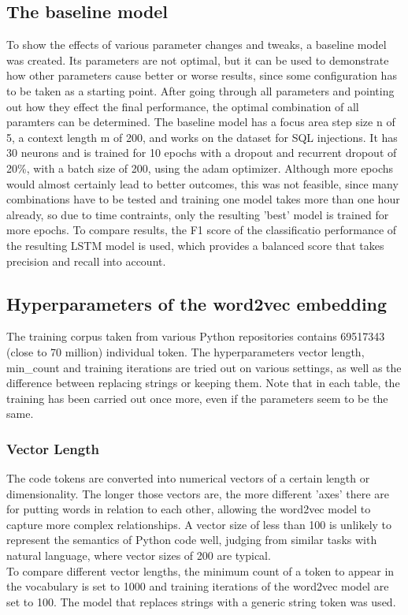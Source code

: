 \documentclass[
	a4paper,
	pagesize,
	pdftex,
	12pt,
	twoside, %
	BCOR=5mm, %
	ngerman,
	fleqn,
	final,
	]{scrartcl}
\begin{document}
\subsection{The baseline model}
To show the effects of various parameter changes and tweaks, a baseline model was created. Its parameters are not optimal, but it can be used to demonstrate how other parameters cause better or worse results, since some configuration has to be taken as a starting point. After going through all parameters and pointing out how they effect the final performance, the optimal combination of all paramters can be determined. The baseline model has a focus area step size n of 5, a context length m of 200, and works on the dataset for SQL injections. It has 30 neurons and is trained for 10 epochs with a dropout and recurrent dropout of 20\%, with a batch size of 200, using the adam optimizer. Although more epochs would almost certainly lead to better outcomes, this was not feasible, since many combinations have to be tested and training one model takes more than one hour already, so due to time contraints, only the resulting 'best' model is trained for more epochs. To compare results, the F1 score of the classificatio performance of the resulting LSTM  model is used, which provides a balanced score that takes precision and recall into account.

\subsection{Hyperparameters of the word2vec embedding}

The training corpus taken from various Python repositories contains 69517343 (close to 70 million) individual token. The hyperparameters vector length, min\_count and training iterations are tried out on various settings, as well as the difference between replacing strings or keeping them. Note that in each table, the training has been carried out once more, even if the parameters seem to be the same.

\subsubsection{Vector Length}
The code tokens are converted into numerical vectors of a certain length or dimensionality. The longer those vectors are, the more different 'axes' there are for putting words in relation to each other, allowing the word2vec model to capture more complex relationships. A vector size of less than 100 is unlikely to represent the semantics of Python code well, judging from similar tasks with natural language, where vector sizes of 200 are typical.\\
To compare different vector lengths, the minimum count of a token to appear in the vocabulary is set to 1000 and training iterations of the word2vec model are set to 100. The model that replaces strings with a generic string token was used.
\end{document}
